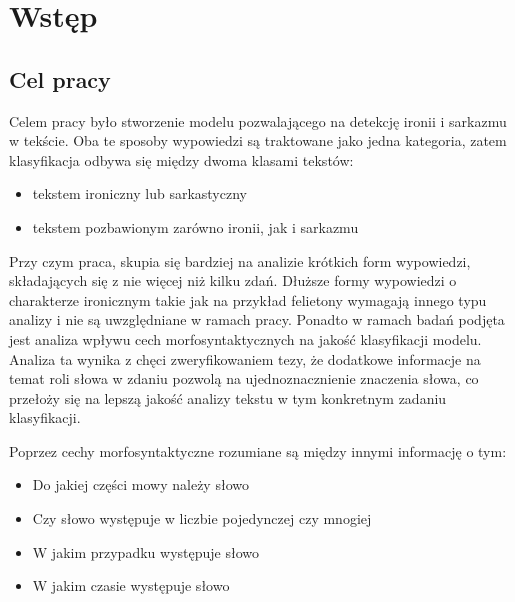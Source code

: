 \newpage %
\section{Wstęp}
\subsection{Cel pracy}

Celem pracy było stworzenie modelu pozwalającego na detekcję ironii i sarkazmu w tekście. Oba te sposoby wypowiedzi są traktowane jako jedna kategoria, zatem klasyfikacja odbywa się między dwoma klasami tekstów:

\begin{itemize}
    \item tekstem ironiczny lub sarkastyczny
    \item tekstem pozbawionym zarówno ironii, jak i sarkazmu
\end{itemize}

Przy czym praca, skupia się bardziej na analizie krótkich form wypowiedzi, składających się z nie więcej niż kilku zdań. Dłuższe formy wypowiedzi o charakterze ironicznym takie jak na przykład felietony wymagają innego typu analizy i nie są uwzględniane w ramach pracy. Ponadto w ramach badań podjęta jest analiza wpływu cech morfosyntaktycznych na jakość klasyfikacji modelu. Analiza ta wynika z chęci zweryfikowaniem tezy, że dodatkowe informacje na temat roli słowa w zdaniu pozwolą na ujednoznacznienie znaczenia słowa, co przełoży się na lepszą jakość analizy tekstu w tym konkretnym zadaniu klasyfikacji.

Poprzez cechy morfosyntaktyczne rozumiane są między innymi informację o tym\cite[]{Radziszewski2012}:
\begin{itemize}
    \item Do jakiej części mowy należy słowo
    \item Czy słowo występuje w liczbie pojedynczej czy mnogiej
    \item W jakim przypadku występuje słowo
    \item W jakim czasie występuje słowo
\end{itemize}





